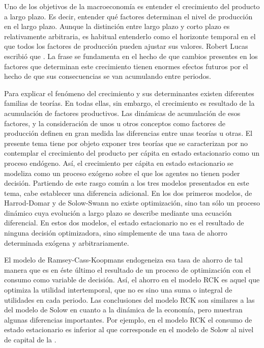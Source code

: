 \documentclass{nuevotema}
\begin{document}
\ideaclave

Uno de los objetivos de la macroeconomía es entender el crecimiento del producto a largo plazo. Es decir, entender qué factores determinan el nivel de producción en el largo plazo. Aunque la distinción entre largo plazo y corto plazo es relativamente arbitraria, es habitual entenderlo como el horizonte temporal en el que todos los factores de producción pueden ajustar sus valores. Robert Lucas escribió que . La frase se fundamenta en el hecho de que cambios presentes en los factores que determinan este crecimiento tienen enormes efectos futuros por el hecho de que sus consecuencias se van acumulando entre periodos.

Para explicar el fenómeno del crecimiento y sus determinantes existen diferentes familias de teorías. En todas ellas, sin embargo, el crecimiento es resultado de la acumulación de factores productivos. Las dinámicas de acumulación de esos factores, y la consideración de unos u otros conceptos como factores de producción definen en gran medida las diferencias entre unas teorías u otras. El presente tema tiene por objeto exponer tres teorías que se caracterizan por no contemplar el crecimiento del producto per cápita en estado estacionario como un proceso endógeno. Así, el crecimiento per cápita en estado estacionario se modeliza como un proceso exógeno sobre el que los agentes no tienen poder decisión. Partiendo de este rasgo común a los tres modelos presentados en este tema, cabe establecer una diferencia adicional. En los dos primeros modelos, de Harrod-Domar y de Solow-Swann no existe optimización, sino tan sólo un proceso dinámico cuya evolución a largo plazo se describe mediante una ecuación diferencial. En estos dos modelos, el estado estacionario no es el resultado de ninguna decisión optimizadora, sino simplemente de una tasa de ahorro determinada exógena y arbitrariamente. 

El modelo de Ramsey-Cass-Koopmans endogeneiza esa tasa de ahorro de tal manera que es en éste último el resultado de un proceso de optimización con el consumo como variable de decisión. Así, el ahorro en el modelo RCK es aquel que optimiza la utilidad intertemporal, que no es sino una suma o integral de utilidades en cada periodo. Las conclusiones del modelo RCK son similares a las del modelo de Solow en cuanto a la dinámica de la economía, pero muestran algunas diferencias importantes. Por ejemplo, en el modelo RCK el consumo de estado estacionario es inferior al que corresponde en el modelo de Solow al nivel de capital de la . 
\end{document}
